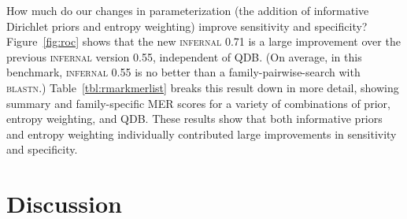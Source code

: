 \documentclass[11pt]{article}
\newif\ifdraft
\begin{document}
\ifdraft

\fi

How much do our changes in parameterization (the addition of
informative Dirichlet priors and entropy weighting) improve
sensitivity and specificity? Figure~\ref{fig:roc} shows that the new
\textsc{infernal} 0.71 is a large improvement over the previous
\textsc{infernal} version 0.55, independent of QDB. (On average, in
this benchmark, \textsc{infernal} 0.55 is no better than a
family-pairwise-search with \textsc{blastn}.) Table~\ref{tbl:rmarkmerlist}
breaks this result down in more detail, showing summary and
family-specific MER scores for a variety of combinations of prior,
entropy weighting, and QDB. These results show that both informative
priors and entropy weighting individually contributed large
improvements in sensitivity and specificity.

\ifdraft

\fi


\section{Discussion}

\begin{comment}
CM searches take a long time, and this is the most limiting factor in
using the \textsc{infernal} software to identify RNA similarities. 
Prior to this work, \textsc{infernal} (version 0.55) required 508
CPU-hours to search 51 models against just 1 megabase of sequence in
our benchmarks (Table~\ref{tbl:rmark}). With QDB (version 0.71), this
time is reduced to 84.51 hours, a six-fold speed-up. Our eventual goal
is to enable routine genome annotation of structural RNAs: to be able
to search thousands of RNA
models against complete genome sequences. 
A search of all 503 Rfam 7.0 models against the 3 GB human genome
would take on the order of 2000 CPU-years. We need to be able to do it
in at most a few days, so  we need to increase CM search speed by five
to six orders of magnitude. Parallelization is feasible, but even large clusters will
give us only about three orders of magnitude.  Moreover,
parallelization on this scale is prohibitively expensive for all but a
few centers. Software improvement (code optimization) will
contribute, but probably only about two-fold.  Hardware improvements
will contribute about two-fold per year or so so long as Moore's law
continues. None of this is sufficient for our immediate purposes.
Algorithmic acceleration is demanded.

The QDB algorithm is a partial but not a complete solution to the
problem. At $\beta$ banding cutoffs that do not appreciably compromise
sensitivity and specificity, QDB offers about a six-fold
speedup in CM searches. However, QDB combines synergistically with
parallelization, code optimization, and hardware improvements, as well
as with the filtering methods recently described by Weinberg and Ruzzo
\cite{WeinbergRuzzo04,WeinbergRuzzo04b,WeinbergRuzzo06}, so we view QDB as part of a
growing suite of approaches that we can combine to accelerate
\textsc{infernal}.
\end{comment}
\end{document}

